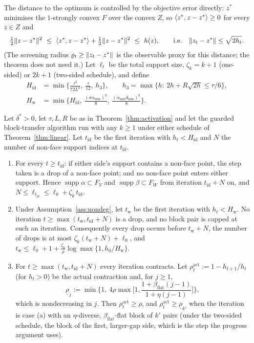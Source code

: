 The distance to the optimum is controlled by the objective error
directly: $z^*$ minimises the $1$-strongly convex $F$ over the convex
$Z$, so $\langle z^*, z-z^* \rangle\ge0$ for every $z\in Z$ and
\begin{equation}\label{eq:dist-h}
\tfrac12\norm{z-z^*}^2\ \le\ \ip{z^*}{z-z^*}+\tfrac12\norm{z-z^*}^2\ \le\ h(z),
\qquad\text{i.e.}\quad \norm{z_t-z^*}\le\sqrt{2h_t}.
\end{equation}
(The screening radius $\varrho_t\ge\lVert z_t-z^* \rVert$ is the observable
proxy for this distance; the theorem does not need it.) Let $\ell_t$ be
the total support size, $\zeta_k=k+1$ (one-sided) or $2k+1$ (two-sided
schedule), and define
\begin{align*}
H_{\mathrm{id}}&=\min\Big\{\frac{\tau^2}{72L^2},\ \frac{\tau}{12},\ h_3\Big\},\qquad
h_3=\max\{h:\ 2h+R\sqrt{2h}\le\tau/6\},\\
H_{\mathrm w}&=\min\Big\{H_{\mathrm{id}},\ \frac{(\sigma\alpha_{\min})^2}{8},\
\frac{(\alpha_{\min}d_{\min})^2}{8}\Big\}.
\end{align*}

\begin{theorem}[Identification and drop count]\label{thm:ident}
Let $\delta^*>0$, let $\tau,L,R$ be as in Theorem~\ref{thm:activation}
and let the guarded block-transfer algorithm run with any $k\ge1$ under
either schedule of Theorem~\ref{thm:linear}. Let $t_{\mathrm{id}}$ be the
first iteration with $h_t<H_{\mathrm{id}}$ and $N$ the number of
non-face support indices at $t_{\mathrm{id}}$.
\begin{enumerate}\setlength\itemsep{0pt}
\item[(i)] For every $t\ge t_{\mathrm{id}}$: if either side's support
contains a non-face point, the step taken is a drop of a non-face point;
and no non-face point enters either support. Hence
$\operatorname{supp}\alpha\subset F_V$ and $\operatorname{supp}\beta\subset F_W$
from iteration $t_{\mathrm{id}}+N$ on, and
$N\le \ell_{t_{\mathrm{id}}}\le \ell_0+\zeta_k\,t_{\mathrm{id}}$.
\item[(ii)] Under Assumption~\ref{ass:nondeg}, let $t_{\mathrm w}$ be the
first iteration with $h_t<H_{\mathrm w}$. No iteration
$t\ge\max(t_{\mathrm w},t_{\mathrm{id}}+N)$ is a drop, and no block pair
is capped at such an iteration. Consequently every drop occurs before
$t_{\mathrm w}+N$, the number of drops is at most
$\zeta_k(t_{\mathrm w}+N)+\ell_0$, and
$t_{\mathrm w}\le \ell_0+1+\tfrac{\zeta_k}{\rho}\log\max\{1,h_0/H_{\mathrm w}\}$.
\item[(iii)] For $t\ge\max(t_{\mathrm w},t_{\mathrm{id}}+N)$ every
iteration contracts. Let $\rho^{\mathrm{act}}_t:=1-h_{t+1}/h_t$ (for
$h_t>0$) be the actual contraction and, for $j\ge1$,
\[
\underline\rho_j:=\min\Big\{1,\ 4\rho\max\Big[1,\frac{1+\beta_{\mathrm{flat}}(j-1)}{1+\eta(j-1)}\Big]\Big\},
\]
which is nondecreasing in $j$. Then $\rho^{\mathrm{act}}_t\ge\rho$, and
$\rho^{\mathrm{act}}_t\ge\underline\rho_{k'}$ when the iteration is case
(a) with an $\eta$-diverse, $\beta_{\mathrm{flat}}$-flat block of $k'$
pairs (under the two-sided schedule, the block of the first,
larger-gap side, which is the step the progress argument uses).
\end{enumerate}
\end{theorem}

